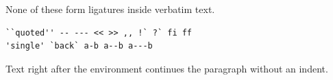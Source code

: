 \documentclass{article}
\begin{document}
None of these form ligatures inside verbatim text.
\begin{verbatim}
``quoted'' -- --- << >> ,, !` ?` fi ff
'single' `back` a-b a--b a---b
\end{verbatim}
Text right after the environment continues the paragraph without an indent.
\end{document}
